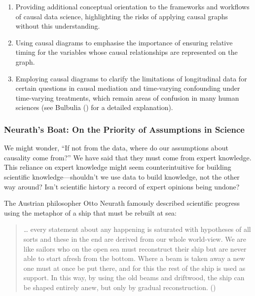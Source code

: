 \documentclass[
  single column]{article}
\providecommand{\tightlist}{%
  \setlength{\itemsep}{0pt}\setlength{\parskip}{0pt}}\usepackage{longtable,booktabs,array}
\begin{document}
\begin{enumerate}
\def\labelenumi{\arabic{enumi}.}
\tightlist
\item
  Providing additional conceptual orientation to the frameworks and
  workflows of causal data science, highlighting the risks of applying
  causal graphs without this understanding.
\item
  Using causal diagrams to emphasise the importance of ensuring relative
  timing for the variables whose causal relationships are represented on
  the graph.
\item
  Employing causal diagrams to clarify the limitations of longitudinal
  data for certain questions in causal mediation and time-varying
  confounding under time-varying treatments, which remain areas of
  confusion in many human sciences (see Bulbulia
  () for a detailed
  explanation).
\end{enumerate}

\subsubsection{Neurath's Boat: On the Priority of Assumptions in
Science}\label{neuraths-boat-on-the-priority-of-assumptions-in-science}

We might wonder, ``If not from the data, where do our assumptions about
causality come from?'' We have said that they must come from expert
knowledge. This reliance on expert knowledge might seem counterintuitive
for building scientific knowledge---shouldn't we use data to build
knowledge, not the other way around? Isn't scientific history a record
of expert opinions being undone?

The Austrian philosopher Otto Neurath famously described scientific
progress using the metaphor of a ship that must be rebuilt at sea:

\begin{quote}
\ldots{} every statement about any happening is saturated with
hypotheses of all sorts and these in the end are derived from our whole
world-view. We are like sailors who on the open sea must reconstruct
their ship but are never able to start afresh from the bottom. Where a
beam is taken away a new one must at once be put there, and for this the
rest of the ship is used as support. In this way, by using the old beams
and driftwood, the ship can be shaped entirely anew, but only by gradual
reconstruction. ()
\end{quote}
\end{document}
